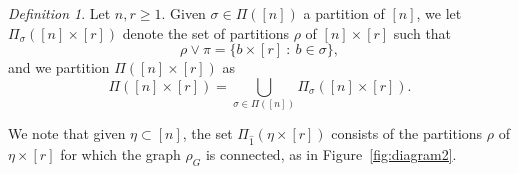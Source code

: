 \documentclass[bj,authoryear,noshowframe]{imsart}
\theoremstyle{plain}
\theoremstyle{remark}
\newtheorem{definition}[theorem]{Definition}
\begin{document}
\vspace{-0.4cm}
  
\begin{definition}
 Let $n , r \geq 1$. 
 Given $\sigma \in \Pi ([n] )$ a partition of $[n]$, 
 we let $\Pi_\sigma ( [n] \times [r])$ denote the set of
 partitions $\rho$ of $[n] \times [r]$ such that
 $$
 \rho\vee\pi= \{ b \times [r] \ : \ b \in \sigma \}, 
 $$
 and %
 we partition $\Pi ([n] \times [r])$ as
\begin{equation}
\label{partition} 
 \Pi ([n] \times [r])
 = \bigcup_{\sigma \in \Pi ([n] )} \Pi_\sigma ([n] \times [r]). 
\end{equation} 
\end{definition}
 We note that given $\eta \subset [n]$,
the set $\Pi_{\widehat{1}} ( \eta \times [r])$ consists of the partitions
$\rho$ of $\eta \times [r]$ for which the graph $\rho_G$
is connected, as in Figure~\ref{fig:diagram2}. 

\end{document}
